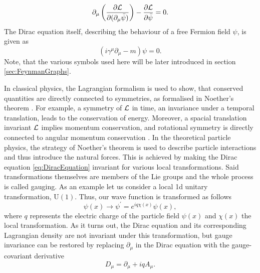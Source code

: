 \begin{equation} \label{eq:EulerLagrangeSpinor}
    \partial_{\mu}\left( \frac{\partial \mathcal{L}}{\partial (\partial_{\mu}\bar{\psi})} \right) - \frac{\partial \mathcal{L}}{\partial \bar{\psi}} = 0.
\end{equation}
The Dirac equation itself, describing the behaviour of a free \gls{Fermion} field $\psi$, is given as
\begin{equation} \label{eq:DiracEquation}
    (i \gamma^{\mu} \partial_{\mu} - m) \psi = 0.
\end{equation}
Note, that the various symbols used here will be later introduced in section \ref{sec:FeynmanGraphs}.

In classical physics, the Lagrangian formalism is used to show, that conserved quantities are directly connected to symmetries, as formalised in Noether's theorem \cite{NoethersTheorem1,NoethersTheorem2}. For example, a symmetry of $\mathcal{L}$ in time, \ie an invariance under a temporal translation, leads to the conservation of energy. Moreover, a spacial translation invariant $\mathcal{L}$ implies momentum conservation, and rotational symmetry is directly connected to angular momentum conservation \cite{PhysicsFromSymmetry}. In the theoretical particle physics, the strategy of Noether's theorem is used to describe particle interactions and thus introduce the natural forces. This is achieved by making the Dirac equation \ref{eq:DiracEquation} invariant for various local transformations. Said transformations themselves are members of the Lie groups \cite{LieGroup} and the whole process is called gauging. As an example let us consider a local \gls{1d} unitary transformation, \ie $\text{U}(1)$. Thus, our wave function is transformed as follows \cite{ModernParticlePhysics,GaugeTheories}
\begin{equation} \label{eq:GaugeTransformation}
    \psi(x) \rightarrow \psi^{\prime} = e^{iq\chi(x)} \psi(x),
\end{equation}
where $q$ represents the electric charge of the particle field $\psi(x)$ and $\chi(x)$ the local transformation. As it turns out, the Dirac equation and its corresponding Lagrangian density are not invariant under this transformation, but gauge invariance can be restored by replacing $\partial_\mu$ in the Dirac equation with the gauge-covariant derivative \cite{ModernParticlePhysics,GaugeTheories}
\begin{equation}
    D_\mu = \partial_\mu +iqA_\mu.
\end{equation}
